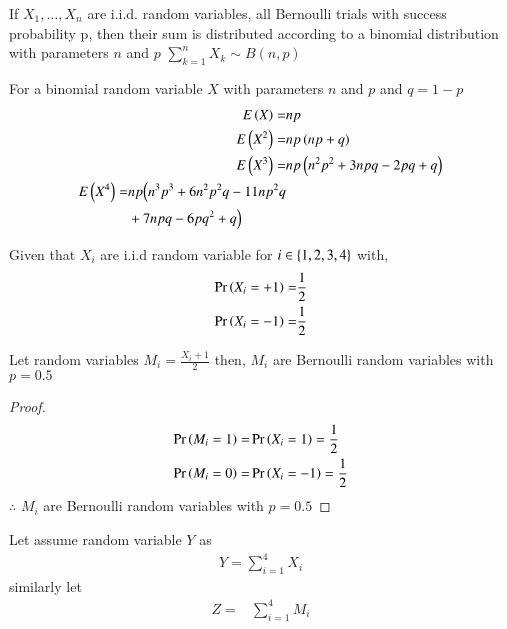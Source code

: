 \begin{theorem}
    If ${ X_{1},\dots ,X_{n}}$ are i.i.d. random variables, all Bernoulli trials with success probability p, then their sum is distributed according to a binomial distribution with parameters $n$ and $p$
    {\centering
    ${\displaystyle \sum _{k=1}^{n}X_{k}\sim  {B} (n,p)}$
    }
    \label{binom/3/binom_theorem}
    \end{theorem}
    \begin{corollary}
    For a binomial random variable $X$ with parameters $n$ and $p$ and $q=1-p$
    \begin{align}
        E\left(X\right)=& n p 
        \\E\left(X^2\right)=& n p \left(n p+q\right)
        \\E\left(X^3\right)=& n p \left(n^{2} p^{2} + 3 n p q - 2 p q + q\right)
        \\
        \begin{split}
             E\left(X^4\right)=&n p \Bigl(n^{3} p^{3} + 6 n^{2} p^{2} q
            - 11 n p^{2} q  \\& + 7 n p q - 6 p q^{2} + q\Bigr)
        \end{split}
    \end{align}
    \label{binom/3/corolary-momentof-Binom}
    \end{corollary}
    Given that $X_i$ are i.i.d random variable for $i \in \left\{1,2,3,4\right\} $ 
    with,
    \begin{align}
        \Pr\left(X_i=+1\right)=&\frac{1}{2}
        \\\Pr\left(X_i=-1\right)=&\frac{1}{2}
    \end{align}
    \begin{lemma}
    Let random variables $M_i=\frac{X_i+1}{2}$ then,
    $M_i$ are Bernoulli random variables with $p=0.5$
    \end{lemma}
    \begin{proof}
    \begin{align}
        \Pr\left(M_i=1\right)=&\Pr\left(X_i=1\right)=\frac{1}{2}
        \\\Pr\left(M_i=0\right)=&\Pr\left(X_i=-1\right)=\frac{1}{2}
    \end{align}
    $\therefore$ $M_i$ are Bernoulli random variables with $p=0.5$
    \end{proof}
    Let assume random variable $Y$ as
    \begin{align}
    Y=\sum_{i=1}^{4}X_i
    \end{align} 
    similarly let 
    \begin{align}
    Z=&\sum_{i=1}^{4}M_i
    \end{align}
